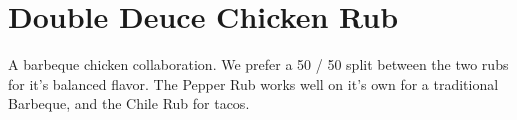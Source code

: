 \section[Double Deuce]{Double Deuce Chicken Rub}\label{double_duece_rub}


\begin{recipestats}[
	servings=1~\pound,
	preptime=10~\minute,
	original=Kevin \& Mike,
]
\end{recipestats}


\begin{recipeabstract}
	A barbeque chicken collaboration.
	We prefer a 50 / 50 split between the two rubs for it's balanced flavor.
	The Pepper Rub works well on it's own for a traditional Barbeque, and the Chile Rub for tacos.
\end{recipeabstract}


\begin{ingredientcolumns}
	\begin{ingredientblock}
		\\
		\\
		\\
		\\
		\\
	\end{ingredientblock}
	\vfill\null
	\columnbreak

	\begin{ingredientblock}
		\\
		\\
		\\
		\\
		\\
		\\
		\\
	\end{ingredientblock}
\end{ingredientcolumns}


